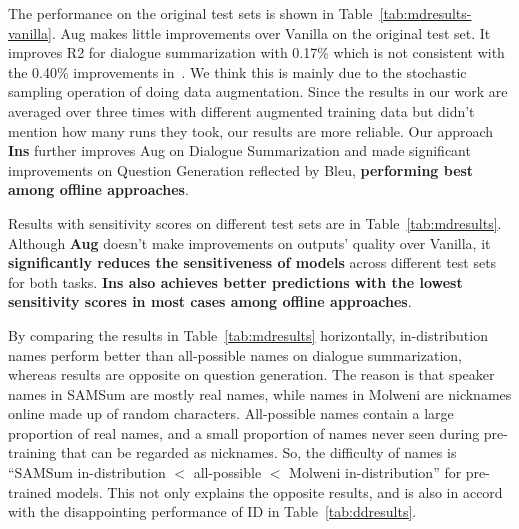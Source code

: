 The performance on the original test sets is shown in Table~\ref{tab:mdresults-vanilla}. Aug makes little improvements over Vanilla on the original test set. It improves R2 for dialogue summarization with 0.17\% which is not consistent with the 0.40\% improvements in~\citet{liu2021controllable}. We think this is mainly due to the stochastic sampling operation of doing data augmentation.
Since the results in our work are averaged over three times with different augmented training data but \citet{liu2021controllable} didn't mention how many runs they took, our results are more reliable. 
Our approach \textbf{Ins} further improves Aug on Dialogue Summarization and made significant improvements on Question Generation reflected by Bleu, \textbf{performing best among offline approaches}.

Results with sensitivity scores on different test sets are in Table~\ref{tab:mdresults}. 
Although \textbf{Aug} doesn't make improvements on outputs' quality over Vanilla, it \textbf{significantly reduces the sensitiveness of models} across different test sets for both tasks. 
\textbf{Ins also achieves better predictions with the lowest sensitivity scores in most cases among offline approaches}. %

By comparing the results in Table~\ref{tab:mdresults} horizontally, in-distribution names perform better than all-possible names on dialogue summarization, whereas results are opposite on question generation. The reason is that speaker names in SAMSum are mostly real names, while names in Molweni are nicknames online made up of random characters. All-possible names contain a large proportion of real names, and a small proportion of names never seen during pre-training that can be regarded as nicknames. So, the difficulty of names is ``SAMSum in-distribution  $<$ all-possible $<$ Molweni in-distribution'' for pre-trained models. This not only explains the opposite results, and is also in accord with the disappointing performance of ID in Table~\ref{tab:ddresults}. %


